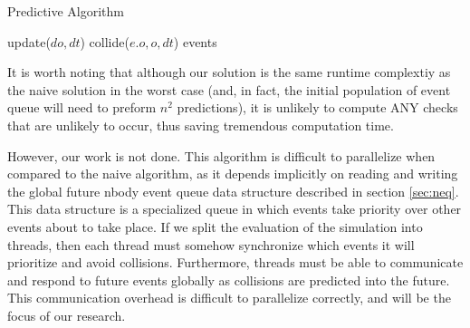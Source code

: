\documentclass[conference]{IEEEtran}
\begin{document}
\begin{algorithm}
\caption{Predictive Algorithm}
\begin{algorithmic}
\STATE {} %
		\STATE update($do,dt$)  
		\STATE {}
					\STATE collide($e.o, o, dt$) 
				\ENDIF
			\ENDFOR
		\ENDFOR
	\ENDFOR
\ENDFOR
\RETURN events
\end{algorithmic}
\end{algorithm}

It is worth noting that although our solution is the same runtime complextiy as the naive solution in the worst case (and, in fact, the initial population of event queue will need to preform $n^2$ predictions), it is unlikely to compute ANY checks that are unlikely to occur, thus saving tremendous computation time.  

However, our work is not done.  This algorithm is difficult to parallelize when compared to the naive algorithm, as it depends implicitly on reading and writing the global future nbody event queue data structure described in section \ref{sec:neq}.  This data structure is a specialized queue in which events take priority over other events about to take place. If we split the evaluation of the simulation into threads, then each thread must somehow synchronize which events it will prioritize and avoid collisions.  Furthermore, threads must be able to communicate and respond to future events  globally as collisions are predicted into the future.  This communication overhead is difficult to parallelize correctly, and will be the focus of our research.
\end{document}
